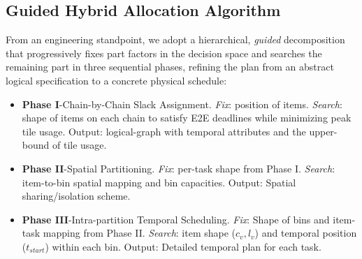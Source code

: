 \subsection{Guided Hybrid Allocation Algorithm}
From an engineering standpoint, we adopt a hierarchical, \emph{guided} decomposition that progressively fixes part factors in the decision space and searches the remaining part in three sequential phases, refining the plan from an abstract logical specification to a concrete physical schedule:
\begin{itemize}[leftmargin=*, nosep]
  \item \textbf{Phase I}{-Chain-by-Chain Slack Assignment.} \emph{Fix}: position of items. \emph{Search}: shape of items on each chain to satisfy E2E deadlines while minimizing peak tile usage. Output: logical-graph with temporal attributes and the upper-bound of tile usage.
  \item \textbf{Phase II}{-Spatial Partitioning.} \emph{Fix}: per-task shape from Phase I. \emph{Search}: item-to-bin spatial mapping and bin capacities. Output: Spatial sharing/isolation scheme.
  \item \textbf{Phase III}{-Intra-partition Temporal Scheduling.} \emph{Fix}: Shape of bins and item-task mapping from Phase II. \emph{Search}: item shape ($c_v, l_v$) and temporal position ($t_{start}$) within each bin. Output: Detailed temporal plan for each task.
\end{itemize}

